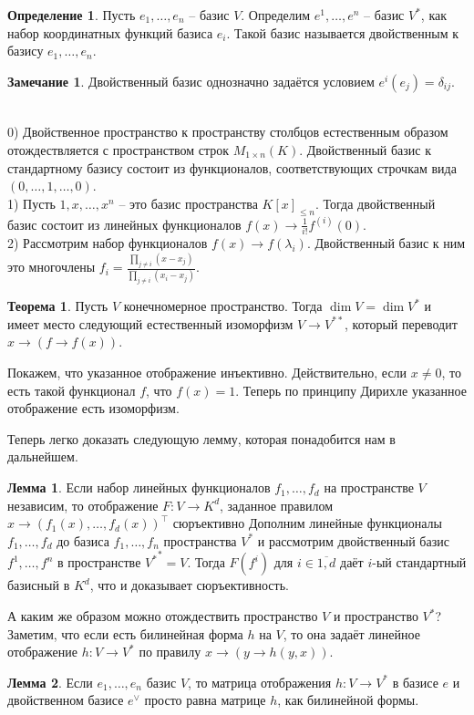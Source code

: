 \documentclass[10pt,a4paper,oneside]{book}
\theoremstyle{definition}
\newtheorem*{rem}{Замечание}
\newtheorem*{defn}{Определение}
\newtheorem{thm}{Теорема}
\newtheorem{lem}{Лемма}
\newcommand{\ovl}{\overline}
\def\exm{\noindent {\bf Примеры:}}
\def\thrm{\begin{thm}}
\def\ethrm{\end{thm}}
\def\dfn{\begin{defn}}
\def\edfn{\end{defn}}
\def\lm{\begin{lem}}
\def\elm{\end{lem}}
\def\rm{\begin{rem}}
\def\erm{\end{rem}}
\begin{document}
\dfn Пусть $e_1,\dots,e_n$ -- базис $V$. Определим $e^1,\dots, e^n$ -- базис $V^*$, как набор координатных функций базиса $e_i$. Такой базис называется двойственным к базису $e_1,\dots,e_n$. 
\edfn

\rm Двойственный базис однозначно задаётся условием $e^i(e_j)=\delta_{ij}$.
\erm

\exm\\
0) Двойственное пространство к пространству столбцов естественным образом отождествляется с пространством строк $M_{1\times n}(K)$. Двойственный базис к стандартному базису состоит из функционалов, соответствующих строчкам вида $(0,\dots, 1, \dots, 0)$.\\ 
1) Пусть $1,x,\dots, x^n$ -- это базис пространства $K[x]_{\leq n}$. Тогда двойственный базис состоит из линейных функционалов $f(x)\to \frac{1}{i!}f^{(i)}(0)$.\\
2) Рассмотрим набор функционалов $f(x)\to f(\lambda_i)$. Двойственный базис к ним это многочлены $f_i=\frac{\prod_{j\neq i} (x-x_j)}{\prod_{j\neq i}{(x_i-x_j)}}$.




\thrm Пусть $V$ конечномерное пространство. Тогда $\dim V = \dim V^{*} $ и имеет место следующий естественный изоморфизм $V \to V^{**} $, который переводит $x \to (f\to f(x))$.
\ethrm
\proof Покажем, что указанное отображение инъективно. Действительно, если $x\neq 0$, то есть такой функционал $f$, что $f(x)=1$. 
Теперь по принципу Дирихле указанное отображение есть изоморфизм.
\endproof


Теперь легко доказать следующую лемму, которая понадобится нам в дальнейшем.

\lm Если набор линейных функционалов $f_1,\dots,f_d$ на пространстве $V$  независим, то отображение $F\colon V\to K^d$, заданное правилом $x \to (f_1(x),\dots, f_d(x))^{\top}$ сюръективно
\proof Дополним линейные функционалы $f_1,\dots,f_d$ до базиса $f_1,\dots,f_n$ пространства $V^*$ и рассмотрим двойственный базис $f^1,\dots,f^n$ в пространстве ${V^*}^*=V$. Тогда $F(f^i)$ для $i\in\ovl{1,d}$ даёт $i$-ый стандартный базисный в $K^d$, что и доказывает сюръективность.
\endproof
\elm


А каким же образом можно отождествить пространство $V$ и пространство $V^*$?
Заметим, что если есть билинейная форма $h$ на $V$, то она задаёт линейное отображение $h\colon V \to V^*$ по правилу $x \to (y \to h(y,x))$. 

\lm Если $e_1,\dots, e_n$ базис $V$, то матрица отображения $h\colon V \to V^*$ в базисе $e$ и двойственном базисе $e^{\vee}$ просто равна матрице $h$, как билинейной формы.
\elm
\end{document}
